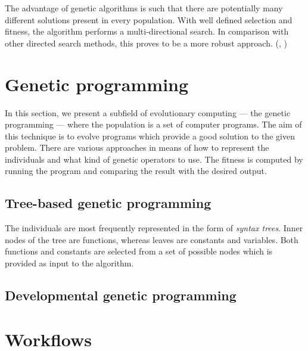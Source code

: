 The advantage of genetic algorithms is such that there are potentially many different solutions present in every population. With well defined selection and fitness, the algorithm performs a multi-directional search. In comparison with other directed search methods, this proves to be a more robust approach. (\cite{Michalewicz:1996:GAD:229930}, \cite{Mitchell:1997:ML:541177}) %

\section{Genetic programming}
In this section, we present a subfield of evolutionary computing --- the genetic programming --- where the population is a set of computer programs. The aim of this technique is to evolve programs which provide a good solution to the given problem. There are various approaches in means of how to represent the individuals and what kind of genetic operators to use. The fitness is computed by running the program and comparing the result with the desired output. \cite{Poli:2008:FGG:1796422}
\subsection{Tree-based genetic programming}
The individuals are most frequently represented in the form of \textit{syntax trees}. Inner nodes of the tree are functions, whereas leaves are constants and variables. Both functions and constants are selected from a set of possible nodes which is provided as input to the algorithm.


\subsection{Developmental genetic programming}

\section{Workflows}
